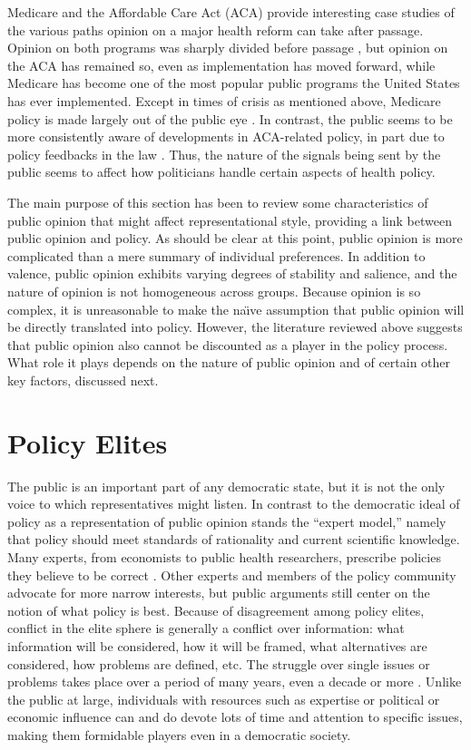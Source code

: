 Medicare and the Affordable Care Act (ACA) provide interesting case studies of the various paths opinion on a major health reform can take after passage. Opinion on both programs was sharply divided before passage \citep{Marmor1970,Starr2011}, but opinion on the ACA has remained so, even as implementation has moved forward, while Medicare has become one of the most popular public programs the United States has ever implemented. Except in times of crisis as mentioned above, Medicare policy is made largely out of the public eye \citep{Oberlander2003}. In contrast, the public seems to be more consistently aware of developments in ACA-related policy, in part due to policy feedbacks in the law \citep{Oberlander2015}. Thus, the nature of the signals being sent by the public seems to affect how politicians handle certain aspects of health policy.

The main purpose of this section has been to review some characteristics of public opinion that might affect representational style, providing a link between public opinion and policy. As should be clear at this point, public opinion is more complicated than a mere summary of individual preferences. In addition to valence, public opinion exhibits varying degrees of stability and salience, and the nature of opinion is not homogeneous across groups. Because opinion is so complex, it is unreasonable to make the na\"{\i}ve assumption that public opinion will be directly translated into policy. However, the literature reviewed above suggests that public opinion also cannot be discounted as a player in the policy process. What role it plays depends on the nature of public opinion and of certain other key factors, discussed next.

\section*{Policy Elites}

The public is an important part of any democratic state, but it is not the only voice to which representatives might listen. In contrast to the democratic ideal of policy as a representation of public opinion stands the ``expert model,'' namely that policy should meet standards of rationality and current scientific knowledge. Many experts, from economists to public health researchers, prescribe policies they believe to be correct \citep{Oliver2006,Lindblom1965}. Other experts and members of the policy community advocate for more narrow interests, but public arguments still center on the notion of what policy is best. Because of disagreement among policy elites, conflict in the elite sphere is generally a conflict over information: what information will be considered, how it will be framed, what alternatives are considered, how problems are defined, etc. The struggle over single issues or problems takes place over a period of many years, even a decade or more \citep{Sabatier1988,Kingdon1995}. Unlike the public at large, individuals with resources such as expertise or political or economic influence can and do devote lots of time and attention to specific issues, making them formidable players even in a democratic society.

